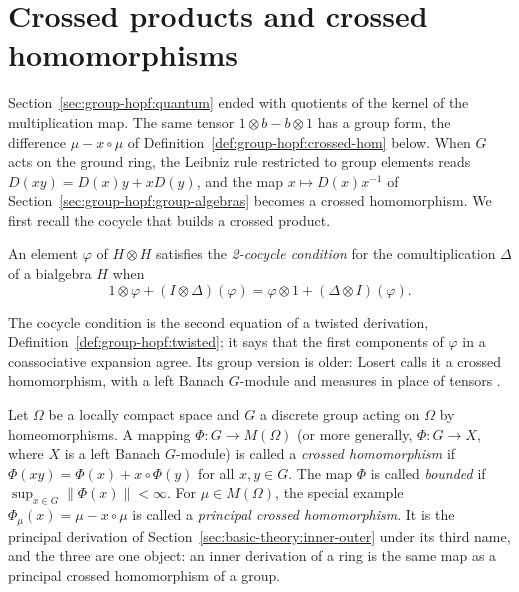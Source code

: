 \section{Crossed products and crossed homomorphisms}\label{sec:group-hopf:crossed-products}

Section~\ref{sec:group-hopf:quantum} ended with quotients of the kernel of the
multiplication map. The same tensor $1\otimes b-b\otimes 1$ has a group form, the
difference $\mu-x\circ\mu$ of Definition~\ref{def:group-hopf:crossed-hom} below.
When $G$ acts on the ground ring, the Leibniz rule restricted
to group elements reads $D(xy)=D(x)y+xD(y)$, and the map $x\mapsto D(x)x^{-1}$ of
Section~\ref{sec:group-hopf:group-algebras} becomes a crossed homomorphism. We
first recall the cocycle that builds a crossed product.

\begin{definition}\label{def:group-hopf:cocycle}
An element $\varphi$ of $H\otimes H$ satisfies the \emph{2-cocycle condition} for
the comultiplication $\Delta$ of a bialgebra $H$ when
\[
1\otimes\varphi+(I\otimes\Delta)(\varphi)=\varphi\otimes1+(\Delta\otimes I)(\varphi).
\]
\end{definition}

The cocycle condition is the second equation of a twisted derivation,
Definition~\ref{def:group-hopf:twisted}; it says that the first components of
$\varphi$ in a coassociative expansion agree. Its group version is older: Losert
calls it a crossed homomorphism, with a left Banach $G$-module and measures in
place of tensors \cite[p.~222]{Losert2008}.

\begin{definition}\label{def:group-hopf:crossed-hom}
Let $\Omega$ be a locally compact space and $G$ a discrete group acting on $\Omega$
by homeomorphisms. A mapping $\Phi\colon G\to M(\Omega)$ (or more generally,
$\Phi\colon G\to X$, where $X$ is a left Banach $G$-module) is called a
\emph{crossed homomorphism} if $\Phi(xy)=\Phi(x)+x\circ\Phi(y)$ for all $x,y\in G$.
The map $\Phi$ is called \emph{bounded} if $\sup_{x\in G}\|\Phi(x)\|<\infty$. For
$\mu\in M(\Omega)$, the special example $\Phi_\mu(x)=\mu-x\circ\mu$ is called a
\emph{principal crossed homomorphism}. It is the principal derivation of
Section~\ref{sec:basic-theory:inner-outer} under its third name, and the three
are one object: an inner derivation of a ring is the same map as a principal
crossed homomorphism of a group.
\end{definition}

